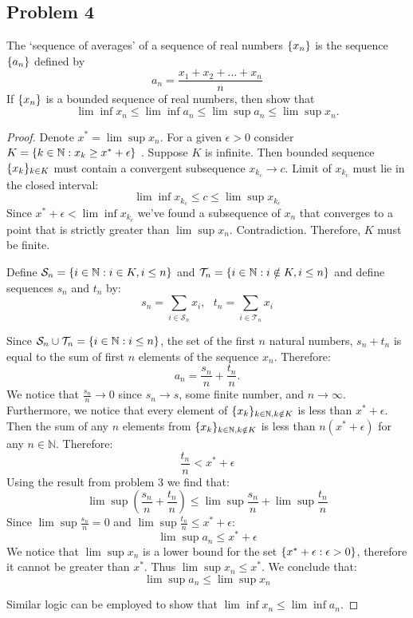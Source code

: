\documentclass{article}
\newcommand{\N}{\mathbb{N}}
\DeclarePairedDelimiter{\set}{ \{ }{ \} }
\begin{document}
\subsection*{Problem 4}

\begin{tcolorbox}
The ‘sequence of averages’ of a sequence of real numbers $\set{x_n}$ is the sequence $\set{a_n}$ defined by
\[ a_n = \frac{x_1+x_2+\dots+x_n}{n} \]
If $\set{x_n}$ is a bounded sequence of real numbers, then show that
\[ \lim \inf x_n \leq \lim \inf a_n \leq \lim \sup a_n \leq \lim \sup x_n. \]
\end{tcolorbox}

\begin{proof}

Denote $x^* = \lim \sup x_n$.
For a given $\epsilon>0$ consider $K = \set{ k \in \N : x_k \geq x^*+\epsilon }$ . Suppose $K$ is infinite. 
Then bounded sequence $\set{ x_k }_{k \in K}$ must contain a convergent subsequence $x_{k_c} \to c$.
Limit of $x_{k_c}$ must lie in the closed interval:
\[ \lim \inf x_{k_c} \leq c \leq \lim \sup x_{k_c} \]
Since $x^*+\epsilon < \lim \inf x_{k_c}$ we've found a subsequence of $x_n$ that converges to a point that is strictly greater than $\lim \sup x_n$. Contradiction.
Therefore, $K$ must be finite.

Define $\mathcal{S}_n = \set{ i \in \N : i \in K, i \leq n }$ and $\mathcal{T}_n = \set{ i \in \N : i \notin K, i \leq n }$ and define sequences $s_n$ and $t_n$ by:
\[ s_n = \sum_{i \in \mathcal{S}_n}x_i, \>\>\> t_n = \sum_{i \in \mathcal{T}_n}x_i \]

Since $\mathcal{S}_n \cup \mathcal{T}_n = \set{ i \in \N : i \leq n }$, the set of the first $n$ natural numbers, $s_n+t_n$ is equal to the sum of first $n$ elements of the sequence $x_n$.
Therefore:
\[ a_n = \frac{s_n}{n}+\frac{t_n}{n}. \]
We notice that $\frac{s_n}{n} \to 0$ since $s_n \to s$, some finite number, and $n \to \infty$.
Furthermore, we notice that every element of $\set{ x_k }_{k \in \N, k \notin K}$ is less than $x^* + \epsilon$.
Then the sum of any $n$ elements from $\set{ x_k }_{k \in \N, k \notin K}$ is less than $n(x^* + \epsilon)$ for any $n \in \N$.
Therefore:
\[ \frac{t_n}{n} < x^* + \epsilon \]
Using the result from problem 3 we find that:
\[ \lim \sup (\frac{s_n}{n}+\frac{t_n}{n}) \leq \lim \sup \frac{s_n}{n} + \lim \sup \frac{t_n}{n} \]
Since $\lim \sup \frac{s_n}{n} = 0$ and $\lim \sup \frac{t_n}{n} \leq x^* + \epsilon$:
\[ \lim \sup a_n \leq x^* + \epsilon \]
We notice that $\lim \sup x_n$ is a lower bound for the set $\set{ x^*+\epsilon : \epsilon>0 }$, therefore it cannot be greater than $x^*$.
Thus $\lim \sup x_n \leq x^*$.
We conclude that:
\[ \lim \sup a_n \leq \lim \sup x_n \]

Similar logic can be employed to show that $\lim \inf x_n \leq \lim \inf a_n$.

\end{proof}
\end{document}
